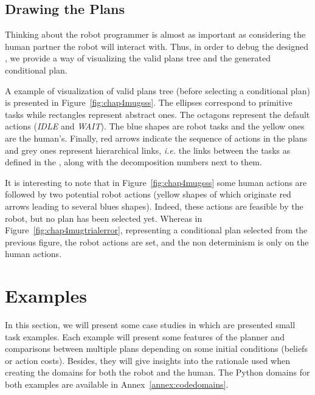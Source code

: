 \documentclass[a4paper,11pt,twoside]{StyleThese}
\begin{document}

\subsection{Drawing the Plans}
Thinking about the robot programmer is almost as important as considering the human partner the robot will interact with. Thus, in order to debug the designed , we provide a way of visualizing the valid plans tree and the generated conditional plan. 

A example of visualization of valid plans tree (before selecting a conditional plan) is presented in Figure~\ref{fig:chap4mugsss}. The ellipses correspond to primitive tasks while rectangles represent abstract ones. The octagons represent the default actions (\textit{IDLE} and \textit{WAIT}). The blue shapes are robot tasks and the yellow ones are the human's. Finally, red arrows indicate the sequence of actions in the plans and grey ones represent hierarchical links, \textit{i.e.} the links between the tasks as defined in the , along with the decomposition numbers next to them.

It is interesting to note that in Figure~\ref{fig:chap4mugsss} some human actions are followed by two potential robot actions (yellow shapes of which originate red arrows leading to several blues shapes). Indeed, these actions are feasible by the robot, but no plan has been selected yet. Whereas in Figure~\ref{fig:chap4mugtrialerror}, representing a conditional plan selected from the previous figure, the robot actions are set, and the non determinism is only on the human actions.

\section{Examples}
In this section, we will present some case studies in which are presented small task examples. Each example will present some features of the planner and comparisons between multiple plans depending on some initial conditions (beliefs or action costs). Besides, they will give insights into the rationale used when creating the domains for both the robot and the human. The Python domains for both examples are available in Annex~\ref{annex:codedomains}.
\end{document}
